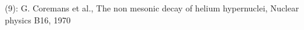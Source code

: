 \documentclass[preview]{standalone}
\begin{document}
\begin{center}
(9): G. Coremans et al., The non mesonic decay of helium hypernuclei, Nuclear physics B16, 1970
\end{center}
\end{document}
